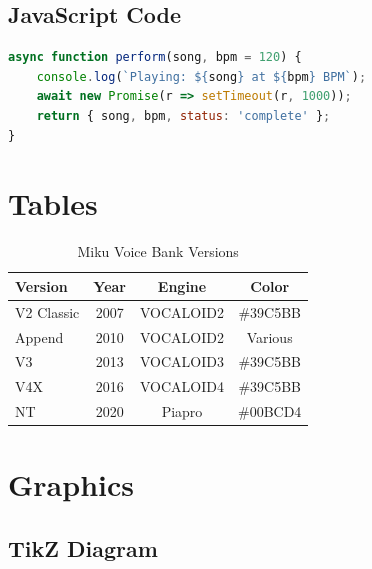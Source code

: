 \documentclass[12pt, a4paper]{article}
\begin{document}
\subsection{JavaScript Code}

\begin{lstlisting}[language=JavaScript, caption={Performance Function}]
async function perform(song, bpm = 120) {
    console.log(`Playing: ${song} at ${bpm} BPM`);
    await new Promise(r => setTimeout(r, 1000));
    return { song, bpm, status: 'complete' };
}
\end{lstlisting}


\section{Tables}

\begin{table}[htbp]
    \centering
    \caption{Miku Voice Bank Versions}
    \label{tab:versions}
    \begin{tabular}{@{} lccc @{}}
        \toprule
        \textbf{Version} & \textbf{Year} & \textbf{Engine} & \textbf{Color} \\
        \midrule
        V2 Classic & 2007 & VOCALOID2 & \textcolor{mikuteal}{\#39C5BB} \\
        Append     & 2010 & VOCALOID2 & Various \\
        V3         & 2013 & VOCALOID3 & \textcolor{mikuteal}{\#39C5BB} \\
        V4X        & 2016 & VOCALOID4 & \textcolor{mikuteal}{\#39C5BB} \\
        NT         & 2020 & Piapro    & \#00BCD4 \\
        \bottomrule
    \end{tabular}
\end{table}


\section{Graphics}

\subsection{TikZ Diagram}
\end{document}
